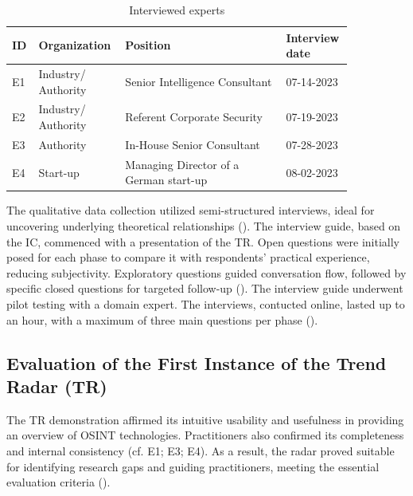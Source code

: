 \documentclass[10pt]{article}
\begin{document}
\begin{table}[hbtp]
    \caption{Interviewed experts}
    \begin{tabular}{p{0.05\linewidth}p{0.2\linewidth}p{0.45\linewidth}p{0.15\linewidth}}
        \toprule
        \textbf{ID} & \textbf{Organization} & \textbf{Position}                      & \textbf{Interview date} \\
        \hline
        E1          & Industry/ Authority   & Senior Intelligence Consultant         & 07-14-2023              \\
        \hline
        E2          & Industry/ Authority   & Referent Corporate Security            & 07-19-2023              \\
        \hline
        E3          & Authority             & In-House Senior Consultant             & 07-28-2023              \\
        \hline
        E4          & Start-up              & Managing Director of a German start-up & 08-02-2023              \\
        \bottomrule
    \end{tabular}
    \label{tab:experts}
\end{table}
The qualitative data collection utilized semi-structured interviews, ideal for uncovering underlying theoretical relationships (\cite{Bogner.2014}). The interview guide, based on the IC, commenced with a presentation of the TR. Open questions were initially posed for each phase to compare it with respondents' practical experience, reducing subjectivity. Exploratory questions guided conversation flow, followed by specific closed questions for targeted follow-up (\cite{Saunders.2012}). The interview guide underwent pilot testing with a domain expert. The interviews, contucted online, lasted up to an hour, with a maximum of three main questions per phase (\cite{Bogner.2014}).

\subsection{Evaluation of the First Instance of the Trend Radar (TR)}

The TR demonstration affirmed its intuitive usability and usefulness in providing an overview of OSINT technologies. Practitioners also confirmed its completeness and internal consistency (cf. E1; E3; E4). As a result, the radar proved suitable for identifying research gaps and guiding practitioners, meeting the essential evaluation criteria (\cite{Sonnenberg.2012}).
\end{document}
